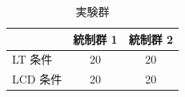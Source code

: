 \documentclass{matsushita-zemi}
\begin{document}
\begin{table}[p]
\caption{実験群}
\label{exp}
\begin{center}
\begin{tabular}{lcc}
\hline\hline
         & 統制群 1 & 統制群 2\\
\hline
LT 条件  & 20       &   20    \\
LCD 条件 & 20       &   20    \\ 
\hline
\end{tabular}
\end{center}
\end{table}



\end{document}

